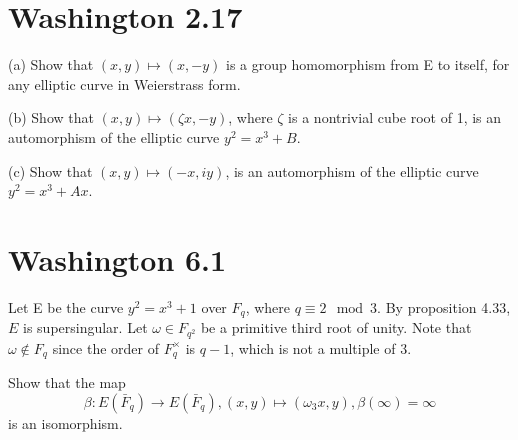 \documentclass{article}
\begin{document}
\section{Washington 2.17}
(a) Show that $(x,y) \mapsto (x,−y)$ is a group homomorphism from E to itself, for any elliptic curve in Weierstrass form.

(b) Show that $(x,y) \mapsto (\zeta x,−y)$, where $\zeta$ is a nontrivial cube root of 1, is an automorphism of the elliptic curve $y^2 = x^3 + B$.

(c) Show that $(x, y) \mapsto (−x, iy)$, is an automorphism of the elliptic curve $y^2 = x^3 + Ax$.

\section{Washington 6.1}
Let E be the curve $y^2 = x^3+1$ over $F_q$, where $q \equiv 2 \mod 3$. By proposition 4.33, $E$ is supersingular. Let $\omega \in F_{q^2}$ be a primitive third root of unity. Note that $\omega \not \in F_q$ since the order of $F_q^\times$ is $q−1$, which is not a multiple of $3$.

Show that the map
$$\beta: E(\bar F_q) \to E(\bar F_q), (x,y) \mapsto (\omega_3 x, y), \beta(\infty) = \infty$$
is an isomorphism.
\end{document}
